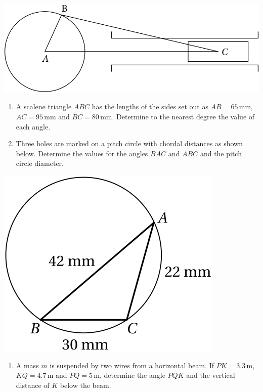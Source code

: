 \documentclass[
  12pt,
  oneside]{book}
\providecommand{\tightlist}{%
  \setlength{\itemsep}{0pt}\setlength{\parskip}{0pt}}
\theoremstyle{definition}
\theoremstyle{definition}
\theoremstyle{definition}
\theoremstyle{definition}
\theoremstyle{remark}
\begin{document}
\begin{center}\includegraphics{t19-crank} \end{center}

\begin{enumerate}
\def\labelenumi{\arabic{enumi}.}
\setcounter{enumi}{1}
\item
  A scalene triangle \(ABC\) has the lengths of the sides set out as \(AB = 65\,\mathrm{mm}\), \(AC = 95\,\mathrm{mm}\) and \(BC = 80\,\mathrm{mm}\). Determine to the nearest degree the value of each angle.
\item
  Three holes are marked on a pitch circle with chordal distances as shown below. Determine
  the values for the angles \(BAC\) and \(ABC\) and the pitch circle diameter.
\end{enumerate}

\begin{center}\includegraphics{t19-circle} \end{center}

\begin{enumerate}
\def\labelenumi{\arabic{enumi}.}
\setcounter{enumi}{3}
\tightlist
\item
  A mass \(m\) is suspended by two wires from a horizontal beam. If \(PK=3.3\,\mathrm{m}\), \(KQ=4.7\,\mathrm{m}\) and \(PQ=5\,\mathrm{m}\), determine the angle \(PQK\) and the vertical distance of \(K\) below the beam.
\end{enumerate}
\end{document}
